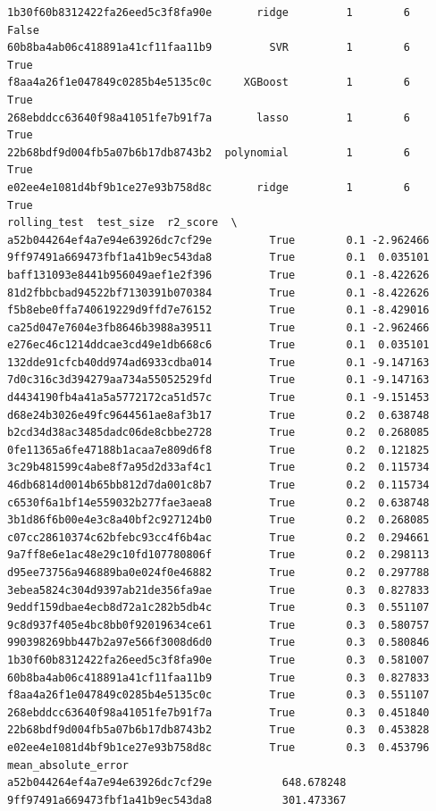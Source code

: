 \begin{verbatim}
1b30f60b8312422fa26eed5c3f8fa90e       ridge         1        6      False
60b8ba4ab06c418891a41cf11faa11b9         SVR         1        6       True
f8aa4a26f1e047849c0285b4e5135c0c     XGBoost         1        6       True
268ebddcc63640f98a41051fe7b91f7a       lasso         1        6       True
22b68bdf9d004fb5a07b6b17db8743b2  polynomial         1        6       True
e02ee4e1081d4bf9b1ce27e93b758d8c       ridge         1        6       True
rolling_test  test_size  r2_score  \
a52b044264ef4a7e94e63926dc7cf29e         True        0.1 -2.962466
9ff97491a669473fbf1a41b9ec543da8         True        0.1  0.035101
baff131093e8441b956049aef1e2f396         True        0.1 -8.422626
81d2fbbcbad94522bf7130391b070384         True        0.1 -8.422626
f5b8ebe0ffa740619229d9ffd7e76152         True        0.1 -8.429016
ca25d047e7604e3fb8646b3988a39511         True        0.1 -2.962466
e276ec46c1214ddcae3cd49e1db668c6         True        0.1  0.035101
132dde91cfcb40dd974ad6933cdba014         True        0.1 -9.147163
7d0c316c3d394279aa734a55052529fd         True        0.1 -9.147163
d4434190fb4a41a5a5772172ca51d57c         True        0.1 -9.151453
d68e24b3026e49fc9644561ae8af3b17         True        0.2  0.638748
b2cd34d38ac3485dadc06de8cbbe2728         True        0.2  0.268085
0fe11365a6fe47188b1acaa7e809d6f8         True        0.2  0.121825
3c29b481599c4abe8f7a95d2d33af4c1         True        0.2  0.115734
46db6814d0014b65bb812d7da001c8b7         True        0.2  0.115734
c6530f6a1bf14e559032b277fae3aea8         True        0.2  0.638748
3b1d86f6b00e4e3c8a40bf2c927124b0         True        0.2  0.268085
c07cc28610374c62bfebc93cc4f6b4ac         True        0.2  0.294661
9a7ff8e6e1ac48e29c10fd107780806f         True        0.2  0.298113
d95ee73756a946889ba0e024f0e46882         True        0.2  0.297788
3ebea5824c304d9397ab21de356fa9ae         True        0.3  0.827833
9eddf159dbae4ecb8d72a1c282b5db4c         True        0.3  0.551107
9c8d937f405e4bc8bb0f92019634ce61         True        0.3  0.580757
990398269bb447b2a97e566f3008d6d0         True        0.3  0.580846
1b30f60b8312422fa26eed5c3f8fa90e         True        0.3  0.581007
60b8ba4ab06c418891a41cf11faa11b9         True        0.3  0.827833
f8aa4a26f1e047849c0285b4e5135c0c         True        0.3  0.551107
268ebddcc63640f98a41051fe7b91f7a         True        0.3  0.451840
22b68bdf9d004fb5a07b6b17db8743b2         True        0.3  0.453828
e02ee4e1081d4bf9b1ce27e93b758d8c         True        0.3  0.453796
mean_absolute_error
a52b044264ef4a7e94e63926dc7cf29e           648.678248
9ff97491a669473fbf1a41b9ec543da8           301.473367

\end{verbatim}
